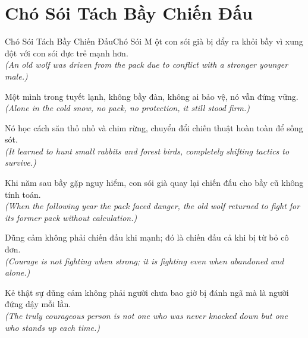 \section{Chó Sói Tách Bầy Chiến Đấu}
\begin{truyen}{Chó Sói Tách Bầy Chiến Đấu}{Chó Sói}
M ột con sói già bị đẩy ra khỏi bầy vì xung đột với con sói đực trẻ mạnh hơn.\\
\textit{(An old wolf was driven from the pack due to conflict with a stronger younger male.)}

Một mình trong tuyết lạnh, không bầy đàn, không ai bảo vệ, nó vẫn đứng vững.\\
\textit{(Alone in the cold snow, no pack, no protection, it still stood firm.)}

Nó học cách săn thỏ nhỏ và chim rừng, chuyển đổi chiến thuật hoàn toàn để sống sót.\\
\textit{(It learned to hunt small rabbits and forest birds, completely shifting tactics to survive.)}

Khi năm sau bầy gặp nguy hiểm, con sói già quay lại chiến đấu cho bầy cũ không tính toán.\\
\textit{(When the following year the pack faced danger, the old wolf returned to fight for its former pack without calculation.)}

Dũng cảm không phải chiến đấu khi mạnh; đó là chiến đấu cả khi bị từ bỏ cô đơn.\\
\textit{(Courage is not fighting when strong; it is fighting even when abandoned and alone.)}

\end{truyen}
\begin{baihoc}
  Kẻ thật sự dũng cảm không phải người chưa bao giờ bị đánh ngã mà là người đứng dậy mỗi lần.\\
  \textit{(The truly courageous person is not one who was never knocked down but one who stands up each time.)}
\end{baihoc}

